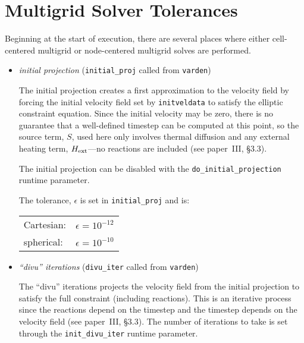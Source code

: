 \section{Multigrid Solver Tolerances}

Beginning at the start of execution, there are several places where either cell-centered
multigrid or node-centered multigrid solves are performed.

\begin{itemize}

\item {\em initial projection} ({\tt initial\_proj} called from {\tt varden})

  The initial projection creates a first approximation to the velocity
  field by forcing the initial velocity field set by {\tt initveldata}
  to satisfy the elliptic constraint equation.  Since the initial
  velocity may be zero, there is no guarantee that a well-defined
  timestep can be computed at this point, so the source term, $S$,
  used here only involves thermal diffusion and any external heating
  term, ${H_{\rm ext}}$---no reactions are included (see paper~III, \S 3.3).

  The initial projection can be disabled with the {\tt do\_initial\_projection}
  runtime parameter.

  The tolerance, $\epsilon$ is set in {\tt initial\_proj} and is:
   \begin{center}
   \begin{tabular}{ll}
   Cartesian:   & $\epsilon = 10^{-12}$ \\
   spherical:   & $\epsilon = 10^{-10}$ \\
   \end{tabular}
   \end{center}


\item {\em ``divu'' iterations} ({\tt divu\_iter} called from {\tt varden})

  The ``divu'' iterations projects the velocity field from the initial
  projection to satisfy the full constraint (including reactions).
  This is an iterative process since the reactions depend on the
  timestep and the timestep depends on the velocity field (see
  paper~III, \S 3.3).  The number of iterations to take is set through
  the {\tt init\_divu\_iter} runtime parameter.


\end{itemize}
